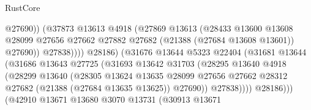 \begin{lexlean}{RustCore}
\begin{coremodule}
                                            @27690))
                                        (@37873
                                          @13613
                                          @4918
                                          (@27869
                                            @13613
                                            (@28433
                                              @13600
                                              @13608
                                              @28099
                                              @27656
                                              @27662
                                              @27882
                                              @27682
                                              (@21388 (@27684 @13608 @13601))
                                              @27690))
                                          @27838))))
                                  @28186)
                                (@31676
                                  @13644
                                  @5323
                                  @22404
                                  (@31681
                                    @13644
                                    (@31686
                                      @13643
                                      @27725
                                      (@31693
                                        @13642
                                        @31703
                                        (@28295
                                          @13640
                                          @4918
                                          (@28299
                                            @13640
                                            (@28305
                                              @13624
                                              @13635
                                              @28099
                                              @27656
                                              @27662
                                              @28312
                                              @27682
                                              (@21388 (@27684 @13635 @13625))
                                              @27690))
                                          @27838))))
                                  @28186)))
                            (@42910
                              @13671
                              @13680
                              @3070
                              @13731
                              (@30913
                                @13671

\end{coremodule}
\end{lexlean}
